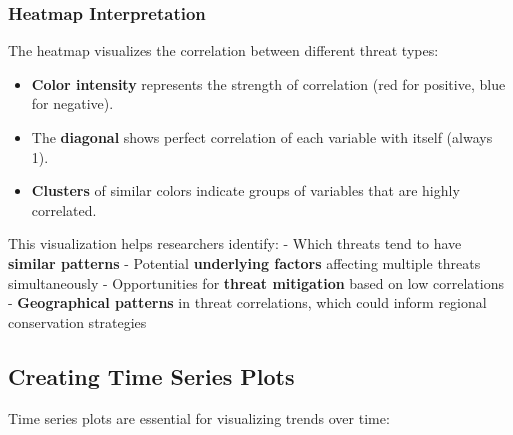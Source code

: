 \documentclass[
  letterpaper,
]{book}
\providecommand{\tightlist}{%
  \setlength{\itemsep}{0pt}\setlength{\parskip}{0pt}}
\begin{document}
\subsubsection{Heatmap Interpretation}\label{heatmap-interpretation}

The heatmap visualizes the correlation between different threat types:

\begin{itemize}
\tightlist
\item
  \textbf{Color intensity} represents the strength of correlation (red
  for positive, blue for negative).
\item
  The \textbf{diagonal} shows perfect correlation of each variable with
  itself (always 1).
\item
  \textbf{Clusters} of similar colors indicate groups of variables that
  are highly correlated.
\end{itemize}

This visualization helps researchers identify: - Which threats tend to
have \textbf{similar patterns} - Potential \textbf{underlying factors}
affecting multiple threats simultaneously - Opportunities for
\textbf{threat mitigation} based on low correlations -
\textbf{Geographical patterns} in threat correlations, which could
inform regional conservation strategies

\subsection{Creating Time Series
Plots}\label{creating-time-series-plots}

Time series plots are essential for visualizing trends over time:
\end{document}
